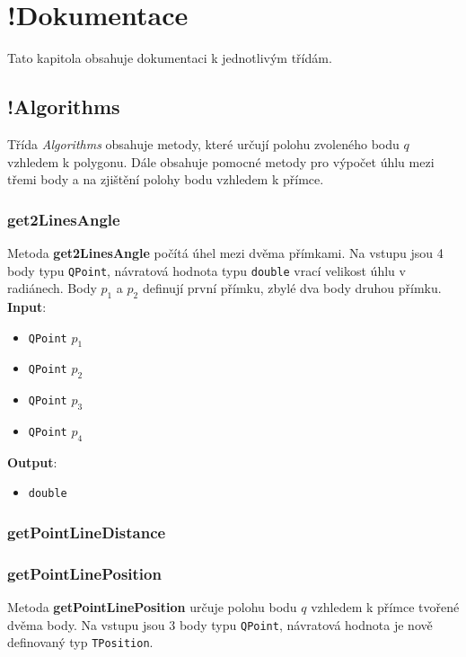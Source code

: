 \documentclass[a4paper, 12pt]{article}
\begin{document}

\clearpage
 
\section{!Dokumentace}
Tato kapitola obsahuje dokumentaci k jednotlivým třídám.

\subsection{!Algorithms}
Třída \textsl{Algorithms} obsahuje metody, které určují polohu zvoleného bodu $q$ vzhledem k polygonu. Dále obsahuje pomocné metody pro výpočet úhlu mezi třemi body a na zjištění polohy bodu vzhledem k přímce. 

\subsubsection{get2LinesAngle}
Metoda \textbf{get2LinesAngle} počítá úhel mezi dvěma přímkami. Na vstupu jsou 4 body typu \texttt{QPoint}, návratová hodnota typu \texttt{double} vrací velikost úhlu v radiánech. Body $p_1$ a $p_2$ definují první přímku, zbylé dva body druhou přímku.\\

\textbf{Input}:
\begin{itemize}
\item \texttt{QPoint} $p_1$ 
\item \texttt{QPoint} $p_2$ 
\item \texttt{QPoint} $p_3$
\item \texttt{QPoint} $p_4$
\end{itemize}

\textbf{Output}:
\begin{itemize}
\item \texttt{double} 
\end{itemize}

\subsubsection{getPointLineDistance}




\subsubsection{getPointLinePosition}
Metoda \textbf{getPointLinePosition} určuje polohu bodu $q$ vzhledem k přímce tvořené dvěma body. Na vstupu jsou 3 body typu \texttt{QPoint}, návratová hodnota je nově definovaný typ \texttt{TPosition}.\\
\end{document}
